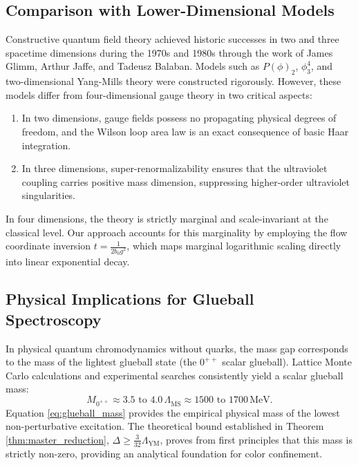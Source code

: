 \documentclass[11pt,reqno]{amsart}
\theoremstyle{plain}
\theoremstyle{definition}
\theoremstyle{remark}
\numberwithin{equation}{section}
\begin{document}
\subsection{Comparison with Lower-Dimensional Models}
Constructive quantum field theory achieved historic successes in two and three spacetime dimensions during the 1970s and 1980s through the work of James Glimm, Arthur Jaffe, and Tadeusz Balaban. Models such as $P(\phi)_2$, $\phi^4_3$, and two-dimensional Yang-Mills theory were constructed rigorously. However, these models differ from four-dimensional gauge theory in two critical aspects:
\begin{enumerate}
\item In two dimensions, gauge fields possess no propagating physical degrees of freedom, and the Wilson loop area law is an exact consequence of basic Haar integration.
\item In three dimensions, super-renormalizability ensures that the ultraviolet coupling carries positive mass dimension, suppressing higher-order ultraviolet singularities.
\end{enumerate}
In four dimensions, the theory is strictly marginal and scale-invariant at the classical level. Our approach accounts for this marginality by employing the flow coordinate inversion $t = \frac{1}{2 b_0 g^2}$, which maps marginal logarithmic scaling directly into linear exponential decay.

\subsection{Physical Implications for Glueball Spectroscopy}
In physical quantum chromodynamics without quarks, the mass gap corresponds to the mass of the lightest glueball state (the $0^{++}$ scalar glueball). Lattice Monte Carlo calculations and experimental searches consistently yield a scalar glueball mass:
\begin{equation}
\label{eq:glueball_mass}
M_{0^{++}} \approx 3.5 \text{ to } 4.0 \, \Lambda_{\overline{\mathrm{MS}}} \approx 1500 \text{ to } 1700 \, \mathrm{MeV}.
\end{equation}
Equation \eqref{eq:glueball_mass} provides the empirical physical mass of the lowest non-perturbative excitation. The theoretical bound established in Theorem \ref{thm:master_reduction}, $\Delta \ge \frac{3}{32} \Lambda_{\mathrm{YM}}$, proves from first principles that this mass is strictly non-zero, providing an analytical foundation for color confinement.
\end{document}
